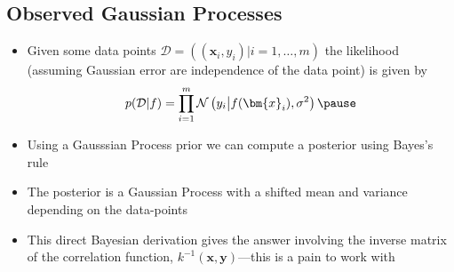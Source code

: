 \Outline %

\begin{slide}
\section[-2]{Observed Gaussian Processes}

\begin{PauseHighLight}
  \begin{itemize}
  \item Given some data points
    $\mathcal{D} = \left( (\bm{x}_i, y_i) \big\vert i=1,\ldots, m
    \right)$ the likelihood (assuming Gaussian error are independence
    of the data point) is given by\vspace*{-0.3cm}
    \begin{align*}
      p(\mathcal{D}| f) = \prod_{i=1}^m
      \mathcal{N}\left(y_i\big\vert f(\bm{x}_i), \sigma^2\right)\pause
    \end{align*}\vspace*{-1.3cm}
  \item Using a Gausssian Process prior we can compute a posterior
    using Bayes's rule\pause
  \item The posterior is a Gaussian Process with a shifted mean and
    variance depending on the data-points\pause
  \item This direct Bayesian derivation gives the answer involving the
    inverse matrix of the correlation function,
    $k^{-1}(\bm{x}, \bm{y})$\pause---this is a pain to work
    with\pauseb
  \end{itemize}
\end{PauseHighLight}

\end{slide}


